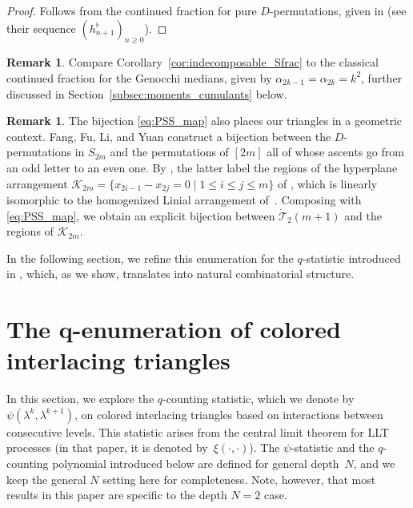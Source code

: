 \documentclass[pdftex]{sigma}
\numberwithin{equation}{section}
\theoremstyle{definition}
\newtheorem{Remark}[Theorem]{Remark}
\begin{document}
\begin{proof}
Follows from
the continued fraction for pure $D$-permutations, given in \cite{DebSokal2024}  (see their sequence
$(h^\flat_{n+1})_{n\ge0}$).
\end{proof}

\begin{Remark}\label{rem:classical_Sfrac}
Compare Corollary~\ref{cor:indecomposable_Sfrac} to the classical
continued fraction for the Genocchi medians, given by $\alpha_{2k-1}=\alpha_{2k}=k^2$, further discussed in
Section~\ref{subsec:moments_cumulants} below.\end{Remark}

\begin{Remark}
	\label{rem:hyperplane_regions}
	The bijection \eqref{eq:PSS_map} also places our triangles in a geometric
	context.
	Fang, Fu, Li, and Yuan
	\cite[Theorem~4.8]{FangFuLiYuan2025} construct a bijection between the
	$D$-permutations in $S_{2m}$ and the permutations of $[2m]$ all of whose
	ascents go from an odd letter to an even one.
	By \cite[Theo\-rem~1.4]{FangFuLiYuan2025}, the latter label the regions of
	the hyperplane arrangement
	$\mathcal{K}_{2m}=\{{x_{2i-1}-x_{2j}=0}\mid 1\le i\le j\le m\}$ of
	\cite{LazarWachs2019}, which is linearly isomorphic to the homogenized
	Linial arrangement of~\cite{Hetyei2019}.
	Composing with \eqref{eq:PSS_map}, we obtain an explicit bijection between
	$\mathring{\mathcal{T}}_2(m+1)$ and the regions of $\mathcal{K}_{2m}$.
\end{Remark}


In the following section, we refine this enumeration for the $q$-statistic
introduced in \cite{ABW2023coloured_LLT},
which, as we show, translates into natural combinatorial structure.

\section[The q-enumeration of colored interlacing triangles]{The $\boldsymbol{q}$-enumeration of colored interlacing triangles}
\label{sec:q_enumeration}

In this section, we explore the $q$-counting statistic, which we denote by
$\psi(\lambda^{k},\lambda^{k+1})$, on colored interlacing triangles based on
interactions between consecutive levels.
This statistic
arises from the
central limit theorem for LLT processes \cite[Section~1.6]{ABW2023coloured_LLT} (in that paper,
it is denoted by~$\xi(\cdot,\cdot)$).
The $\psi$-statistic and the $q$-counting polynomial introduced below are
defined for general depth~$N$, and we keep the general $N$ setting here for completeness.
Note, however, that most results in this paper are specific to the depth $N=2$ case.
\end{document}
